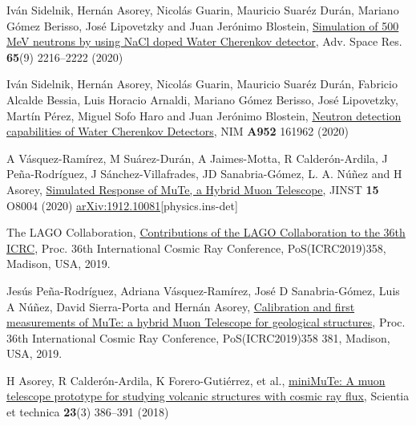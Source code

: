 \begin{etaremune}
\item {} Iván Sidelnik, Hernán Asorey, Nicolás Guarin, Mauricio Suaréz Durán, Mariano Gómez Berisso, José Lipovetzky and Juan Jerónimo Blostein, \href{https://doi.org/10.1016/j.asr.2020.02.024}{{Simulation of 500 MeV neutrons by using NaCl doped Water Cherenkov detector}}, Adv.
Space Res. {\textbf{65}}(9) 2216--2222 (2020) %

\item {} Iván Sidelnik, Hernán Asorey, Nicolás Guarin, Mauricio Suaréz Durán, Fabricio Alcalde Bessia, Luis Horacio Arnaldi, Mariano Gómez Berisso, José Lipovetzky, Martín Pérez, Miguel Sofo Haro and Juan Jerónimo Blostein, \href{https://doi.org/10.1016/j.nima.2019.03.017}{{Neutron detection capabilities of Water Cherenkov Detectors}}, NIM {\textbf{A952}} 161962 (2020) %

\item {} A Vásquez-Ramírez, M Suárez-Durán, A Jaimes-Motta, R Calderón-Ardila, J Peña-Rodríguez, J Sánchez-Villafrades, JD Sanabria-Gómez, L. A. Núñez and H Asorey, \href{https://doi.org/10.1088/1748-0221/15/08/P08004}{{Simulated Response of MuTe, a Hybrid Muon Telescope}}, JINST {\textbf{15}} O8004 (2020) \href{https://arxiv.org/abs/1912.10081}{arXiv:1912.10081}[physics.ins-det]

\item {} The LAGO Collaboration, \href{https://arxiv.org/abs/1909.10039}{Contributions of the LAGO Collaboration to the 36th ICRC}, \en Proc.
36th International Cosmic Ray Conference, PoS(ICRC2019)358, Madison, USA, 2019. %

\item {} Jesús Peña-Rodríguez, Adriana Vásquez-Ramírez, José D Sanabria-Gómez, Luis A Núñez, David Sierra-Porta and Hernán Asorey, \href{https://pos.sissa.it/358/381/}{Calibration and first measurements of MuTe: a hybrid Muon Telescope for geological structures}, \en Proc.
36th International Cosmic Ray Conference, PoS(ICRC2019)358 381, Madison, USA, 2019. %

\item {} H Asorey, R Calderón-Ardila, K Forero-Gutiérrez, et al., \href{http://dx.doi.org/10.22517/23447214.17501}{miniMuTe: A muon telescope prototype for studying volcanic structures with cosmic ray flux}, Scientia et technica {\textbf{23}}(3) 386--391 (2018)


\end{etaremune}
